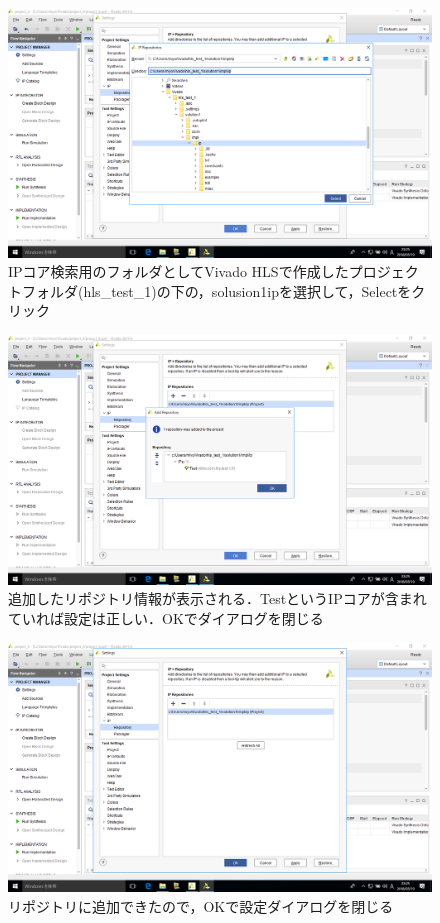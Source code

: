 \documentclass[a4paper,dvipdfmx]{jsarticle}
\begin{document}
 \begin{figure}[H]
  \begin{center}
   \includegraphics[width=.8\textwidth]{chapter08_figures/VirtualBox_Windows10_19_03_2018_23_25_42.png}
  \end{center}
  \caption{IPコア検索用のフォルダとしてVivado HLSで作成したプロジェクトフォルダ(hls\_test\_1)の下の，solusion1\yen ipを選択して，Selectをクリック}
 \end{figure}

 \begin{figure}[H]
  \begin{center}
   \includegraphics[width=.8\textwidth]{chapter08_figures/VirtualBox_Windows10_19_03_2018_23_25_53.png}
  \end{center}
  \caption{追加したリポジトリ情報が表示される．TestというIPコアが含まれていれば設定は正しい．OKでダイアログを閉じる}
 \end{figure}

 \begin{figure}[H]
  \begin{center}
   \includegraphics[width=.8\textwidth]{chapter08_figures/VirtualBox_Windows10_19_03_2018_23_25_58.png}
  \end{center}
  \caption{リポジトリに追加できたので，OKで設定ダイアログを閉じる}
 \end{figure}
\end{document}
